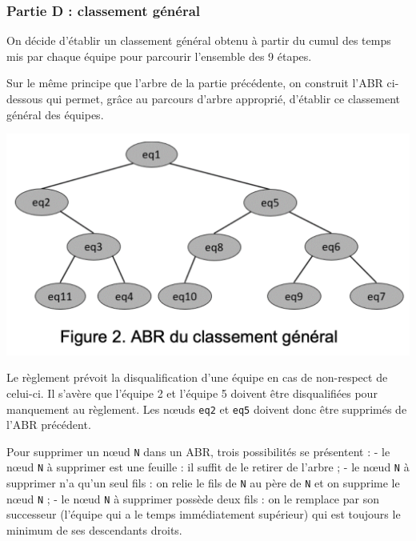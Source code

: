 \begin{Shaded}
\begin{Highlighting}[]
 
     \OperatorTok{==} \NormalTok{:}
       
     \NormalTok{:}
       
\end{Highlighting}
\end{Shaded}

\subsubsection{Partie D : classement
général}\label{partie-d-classement-guxe9nuxe9ral}

On décide d'établir un classement général obtenu à partir du cumul des
temps mis par chaque équipe pour parcourir l'ensemble des 9 étapes.

Sur le même principe que l'arbre de la partie précédente, on construit
l'ABR ci-dessous qui permet, grâce au parcours d'arbre approprié,
d'établir ce classement général des équipes.

\includegraphics{24-NSIJ1ME1-Ex3-04.png}

Le règlement prévoit la disqualification d'une équipe en cas de
non-respect de celui-ci. Il s'avère que l'équipe 2 et l'équipe 5 doivent
être disqualifiées pour manquement au règlement. Les nœuds \texttt{eq2}
et \texttt{eq5} doivent donc être supprimés de l'ABR précédent.

Pour supprimer un nœud \texttt{N} dans un ABR, trois possibilités se
présentent : - le nœud \texttt{N} à supprimer est une feuille : il
suffit de le retirer de l'arbre ; - le nœud \texttt{N} à supprimer n'a
qu'un seul fils : on relie le fils de \texttt{N} au père de \texttt{N}
et on supprime le nœud \texttt{N} ; - le nœud \texttt{N} à supprimer
possède deux fils : on le remplace par son successeur (l'équipe qui a le
temps immédiatement supérieur) qui est toujours le minimum de ses
descendants droits.

